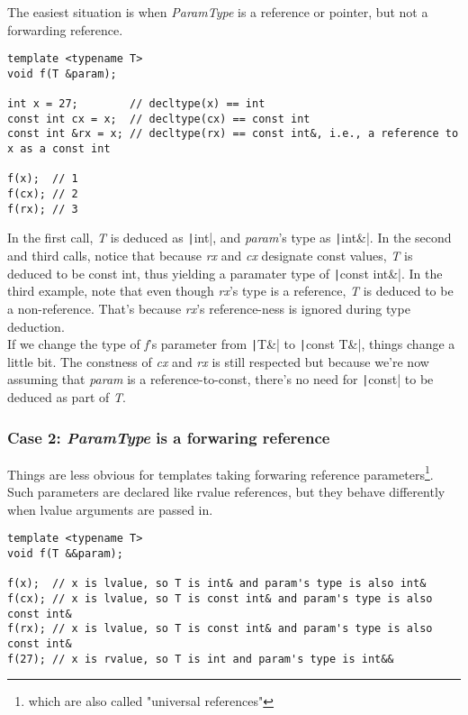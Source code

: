 The easiest situation is when \textit{ParamType} is a reference or pointer, but not a forwarding reference.

\begin{verbatim}
template <typename T>
void f(T &param);

int x = 27;        // decltype(x) == int
const int cx = x;  // decltype(cx) == const int
const int &rx = x; // decltype(rx) == const int&, i.e., a reference to x as a const int

f(x);  // 1
f(cx); // 2
f(rx); // 3
\end{verbatim}

In the first call, \textit{T} is deduced as \texttt|int|, and \textit{param}'s type as \texttt|int&|. In the second and third calls, notice that because \textit{rx} and \textit{cx} designate const values, \textit{T} is deduced to be const int, thus yielding a paramater type of \texttt|const int&|. In the third example, note that even though \textit{rx}'s type  is a reference, \textit{T} is deduced to be a non-reference. That's because \textit{rx}'s reference-ness is ignored during type deduction. \\

If we change the type of \textit{f}'s parameter from \texttt|T&| to \texttt|const T&|, things change a little bit. The constness of \textit{cx} and \textit{rx} is still respected but because we're now assuming that \textit{param} is a reference-to-const, there's no need for \texttt|const| to be deduced as part of \textit{T}.

\subsubsection*{Case 2: \textit{ParamType} is a forwaring reference}

Things are less obvious for templates taking forwaring reference parameters\footnote{which are also called "universal references"}. Such parameters are declared like rvalue references, but they behave differently when lvalue arguments are passed in.

\begin{verbatim}
template <typename T>
void f(T &&param);

f(x);  // x is lvalue, so T is int& and param's type is also int&
f(cx); // x is lvalue, so T is const int& and param's type is also const int&
f(rx); // x is lvalue, so T is const int& and param's type is also const int&
f(27); // x is rvalue, so T is int and param's type is int&&
\end{verbatim}

